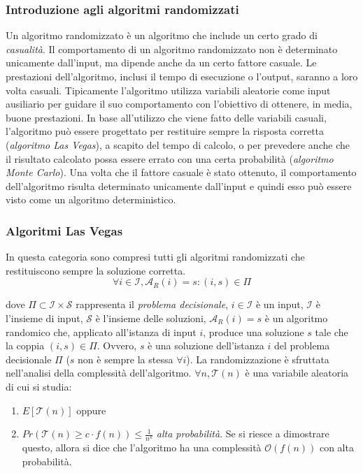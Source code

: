 \subsubsection*{Introduzione agli algoritmi randomizzati}
Un algoritmo randomizzato è un algoritmo che include un certo grado di 
\textit{casualità}. Il comportamento di un algoritmo randomizzato non è determinato 
unicamente dall'input, ma dipende anche da un certo fattore casuale. Le prestazioni 
dell'algoritmo, inclusi il tempo di esecuzione o l'output, saranno a loro volta casuali.
Tipicamente l'algoritmo utilizza variabili aleatorie come input ausiliario 
per guidare il suo comportamento con l'obiettivo di ottenere, in media, buone 
prestazioni. In base all'utilizzo che viene fatto delle variabili 
casuali, l'algoritmo può essere progettato per restituire sempre la risposta corretta 
(\textit{algoritmo Las Vegas}), a scapito del tempo di calcolo, o per prevedere 
anche che il risultato calcolato possa essere errato con una certa probabilità 
(\textit{algoritmo Monte Carlo}). Una volta che il fattore casuale è stato ottenuto, 
il comportamento dell’algoritmo risulta determinato unicamente dall'input e quindi 
esso può essere visto come un algoritmo deterministico.

\subsubsection*{Algoritmi Las Vegas}
In questa categoria sono compresi tutti gli algoritmi randomizzati che restituiscono 
sempre la soluzione corretta.
\[
    \forall i \in \mathcal{I}, \mathcal{A}_{R}(i) = s:(i,s) \in \Pi
\]

dove $\Pi \subset \mathcal{I} \times \mathcal{S}$ rappresenta il 
\textit{problema decisionale}, $i \in \mathcal{I}$ è un input, $\mathcal{I}$ è 
l'insieme di input, $\mathcal{S}$ è l'insieme delle soluzioni, 
$\mathcal{A}_{R}(i) = s$ è un algoritmo randomico che, applicato all'istanza di 
input $i$, produce una soluzione $s$ tale che la coppia $(i,s) \in \Pi$. Ovvero, 
$s$ è una soluzione dell'istanza $i$ del problema decisionale $\Pi$ ($s$ non è 
sempre la stessa $\forall i$). La randomizzazione è sfruttata nell'analisi della 
complessità dell'algoritmo. $\forall n, \mathcal{T}(n)$ è una variabile aleatoria di 
cui si studia:
\begin{enumerate}
    \item $E[\mathcal{T}(n)]$ oppure
    \item $Pr(\mathcal{T}(n) \ge c \cdot f(n)) \le \frac{1}{n^k}$ 
    \textit{alta probabilità}. Se si riesce a dimostrare questo, allora si dice che 
    l'algoritmo ha una complessità $\mathcal{O}(f(n))$ con alta probabilità.
\end{enumerate}

